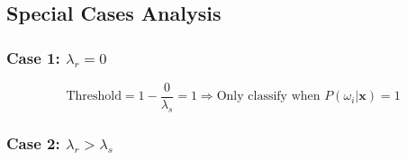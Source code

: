 \documentclass[12pt]{article}
\begin{document}
\subsection{Special Cases Analysis}

\subsubsection{Case 1: $\lambda_r = 0$}

\[
\text{Threshold} = 1 - \frac{0}{\lambda_s} = 1
\Rightarrow \boxed{\text{Only classify when } P(\omega_i|\mathbf{x}) = 1}
\]

\subsubsection{Case 2: $\lambda_r > \lambda_s$}
\end{document}
